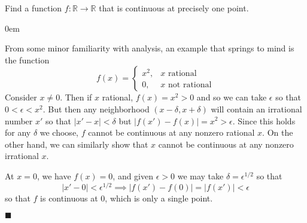 \documentclass[12pt]{article}
\renewcommand{\qed}{\hfill$\blacksquare$}
\renewenvironment{proof}{\begin{addmargin}[1em]{0em}\begin{newproof}}{\end{newproof}\end{addmargin}\qed}
\newenvironment{problem}[2][Exercise]{\begin{trivlist}
\item[\hskip \labelsep {\bfseries #1}\hskip \labelsep {\bfseries #2.}]}{\end{trivlist}}
\begin{document}
\begin{problem}{18.6}
	Find a function $f:\mathbb{R}\rightarrow \mathbb{R}$ that is continuous at precisely one point.
\end{problem}
\begin{proof}
	From some minor familiarity with analysis, an example that springs to mind is the function $$f\left(x\right) = \left\{ \begin{array}{rl}
	x^2, & x \text{ rational} \\
	0, & x \text{ not rational}
\end{array}	 \right. $$
Consider $x \neq 0$. Then if $x$ rational, $f\left(x\right)=x^2 >0 $ and so we can take $\epsilon$ so that $0 < \epsilon < x^2$. But then any neighborhood $\left(x-\delta,x+\delta\right)$ will contain an irrational number $x'$ so that $\left|x'-x\right|<\delta$ but $\left| f\left(x'\right) -f\left(x\right)\right| = x^2 > \epsilon$. Since this holds for any $\delta$ we choose, $f$ cannot be continuous at any nonzero rational $x$. On the other hand, we can similarly show that $x$ cannot be continuous at any nonzero irrational $x$.

At $x=0$, we have $f\left(x\right)=0$, and given $\epsilon>0$ we may take $\delta = \epsilon^{1/2}$ so that $$ \left|x'-0\right| < \epsilon^{1/2} \implies \left|f\left(x'\right) - f\left(0\right)\right| = \left|f\left(x'\right)\right| < \epsilon $$ so that $f$ is continuous at $0$, which is only a single point.
\end{proof}
\end{document}
